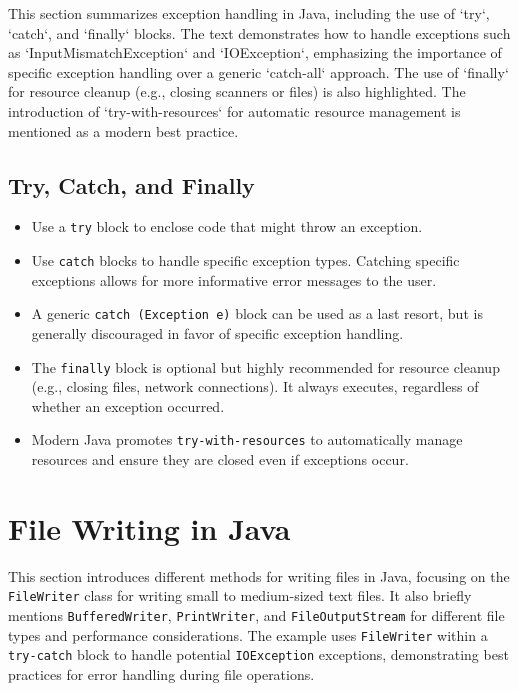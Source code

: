 \documentclass{article}
\begin{document}
This section summarizes exception handling in Java, including the use of `try`, `catch`, and `finally` blocks.  The text demonstrates how to handle exceptions such as `InputMismatchException` and `IOException`, emphasizing the importance of specific exception handling over a generic `catch-all` approach.  The use of `finally` for resource cleanup (e.g., closing scanners or files) is also highlighted.  The introduction of `try-with-resources` for automatic resource management is mentioned as a modern best practice.

\subsection{Try, Catch, and Finally}

\begin{itemize}
    \item Use a \texttt{try} block to enclose code that might throw an exception.
    \item Use \texttt{catch} blocks to handle specific exception types.  Catching specific exceptions allows for more informative error messages to the user.
    \item A generic \texttt{catch (Exception e)} block can be used as a last resort, but is generally discouraged in favor of specific exception handling.
    \item The \texttt{finally} block is optional but highly recommended for resource cleanup (e.g., closing files, network connections). It always executes, regardless of whether an exception occurred.
    \item Modern Java promotes \texttt{try-with-resources} to automatically manage resources and ensure they are closed even if exceptions occur.
\end{itemize}

\section{File Writing in Java}

This section introduces different methods for writing files in Java, focusing on the \texttt{FileWriter} class for writing small to medium-sized text files.  It also briefly mentions \texttt{BufferedWriter}, \texttt{PrintWriter}, and \texttt{FileOutputStream} for different file types and performance considerations.  The example uses \texttt{FileWriter} within a \texttt{try-catch} block to handle potential \texttt{IOException} exceptions, demonstrating best practices for error handling during file operations.
\end{document}
